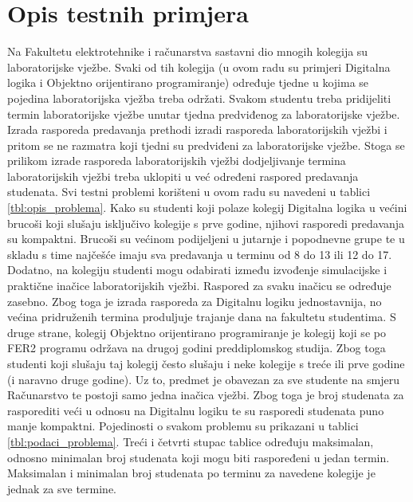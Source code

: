 \documentclass[times, utf8, zavrsni]{fer}
\begin{document}
\section{Opis testnih primjera}
\label{sec:testni_primjeri}
Na Fakultetu elektrotehnike i računarstva sastavni dio mnogih kolegija su laboratorijske vježbe. Svaki od tih kolegija (u ovom radu su primjeri Digitalna logika i
Objektno orijentirano programiranje) određuje tjedne u kojima se pojedina laboratorijska vježba treba održati. Svakom studentu treba pridijeliti termin laboratorijske
vježbe unutar tjedna predviđenog za laboratorijske vježbe. Izrada rasporeda predavanja prethodi izradi rasporeda laboratorijskih vježbi  i pritom se ne razmatra koji tjedni
su predviđeni za laboratorijske vježbe. Stoga se prilikom izrade rasporeda laboratorijskih vježbi dodjeljivanje termina laboratorijskih vježbi treba uklopiti u već određeni
raspored predavanja studenata. Svi testni problemi korišteni u ovom radu su navedeni u tablici \ref{tbl:opis_problema}. Kako su studenti koji polaze kolegij Digitalna logika
u većini brucoši koji slušaju isključivo kolegije s prve godine, njihovi rasporedi predavanja su kompaktni. Brucoši su većinom podijeljeni u jutarnje i popodnevne grupe te u
skladu s time najčešće imaju sva predavanja u terminu od 8 do 13 ili 12 do 17. Dodatno, na kolegiju studenti mogu odabirati između izvođenje simulacijske i praktične inačice
laboratorijskih vježbi. Raspored za svaku inačicu se određuje zasebno. Zbog toga je izrada rasporeda za Digitalnu logiku jednostavnija, no većina pridruženih termina
produljuje trajanje dana na fakultetu studentima. S druge strane, kolegij Objektno orijentirano programiranje je kolegij koji se po FER2 programu održava
na drugoj godini preddiplomskog studija. Zbog toga studenti koji slušaju taj kolegij često slušaju i neke kolegije s treće ili prve godine (i naravno druge godine).
Uz to, predmet je obavezan za sve studente na smjeru Računarstvo te postoji samo jedna inačica vježbi. Zbog toga je broj studenata za rasporediti veći u odnosu na Digitalnu
logiku te su rasporedi studenata puno manje kompaktni. Pojedinosti o svakom problemu su prikazani u tablici \ref{tbl:podaci_problema}. Treći i četvrti stupac tablice određuju
maksimalan, odnosno minimalan broj studenata koji mogu biti raspoređeni u jedan termin. Maksimalan i minimalan broj studenata po terminu za navedene kolegije je jednak
za sve termine.
\end{document}
